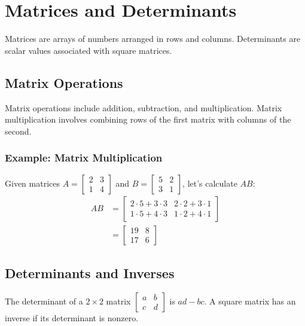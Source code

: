 \documentclass{article}
\begin{document}
\section{Matrices and Determinants}
Matrices are arrays of numbers arranged in rows and columns. Determinants are scalar values associated with square matrices.

\subsection{Matrix Operations}
Matrix operations include addition, subtraction, and multiplication. Matrix multiplication involves combining rows of the first matrix with columns of the second.

\subsubsection{Example: Matrix Multiplication}
Given matrices $A = \begin{bmatrix} 2 & 3 \\ 1 & 4 \end{bmatrix}$ and $B = \begin{bmatrix} 5 & 2 \\ 3 & 1 \end{bmatrix}$, let's calculate $AB$:
\begin{align*}
    AB &= \begin{bmatrix} 2 \cdot 5 + 3 \cdot 3 & 2 \cdot 2 + 3 \cdot 1 \\ 1 \cdot 5 + 4 \cdot 3 & 1 \cdot 2 + 4 \cdot 1 \end{bmatrix} \\
    &= \begin{bmatrix} 19 & 8 \\ 17 & 6 \end{bmatrix}
\end{align*}

\subsection{Determinants and Inverses}
The determinant of a $2 \times 2$ matrix $\begin{bmatrix} a & b \\ c & d \end{bmatrix}$ is $ad - bc$. A square matrix has an inverse if its determinant is nonzero.
\end{document}
